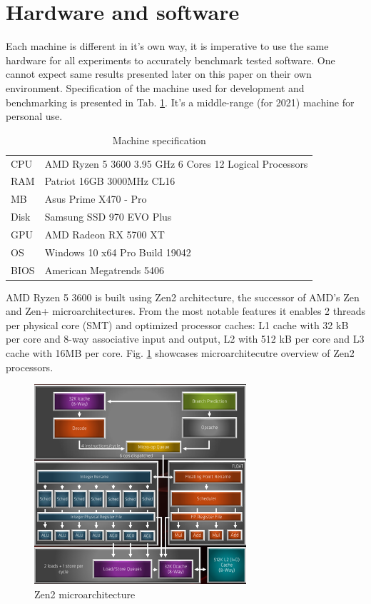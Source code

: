 \clearpage
\section{Hardware and software} 
Each machine is different in it's own way, it is imperative to use the same hardware for all experiments to accurately benchmark tested software. One cannot expect same results presented later on this paper on their own environment. Specification of the machine used for development and benchmarking is presented in Tab. \ref{tab: HardSpec}. It's a middle-range (for 2021) machine for personal use.

\begin{table}[!ht]
    \centering
    \caption{Machine specification}
		\label{tab: HardSpec}
    \begin{tabular}{p{1.5cm}p{6.5cm}}
			\toprule
			CPU  & AMD Ryzen 5 3600 3.95 GHz 6 Cores 12 Logical Processors \\
			RAM  & Patriot 16GB 3000MHz CL16 \\ 
			MB   & Asus Prime X470 - Pro \\ 
			Disk & Samsung SSD 970 EVO Plus \\
			GPU  & AMD Radeon RX 5700 XT \\ 
			OS   & Windows 10 x64 Pro Build 19042 \\ 
			BIOS & American Megatrends 5406 \\ 
			\bottomrule
    \end{tabular}
\end{table}

AMD Ryzen 5 3600 is built using Zen2 architecture,  the successor of AMD's Zen and Zen+ microarchitectures. From the most notable features it enables 2 threads per physical core (SMT) and optimized processor caches: L1 cache with 32 kB  per core and 8-way associative input and output, L2 with 512 kB per core and L3 cache with 16MB per core. Fig. \ref{fig:Zen} showcases microarchitecutre overview of Zen2 processors. \cite{Zen}

\begin{figure}[!ht]
	\centering
		\includegraphics[width = 0.7\textwidth]{figures03/Zen.PNG}
	\caption{Zen2 microarchitecture}
	\label{fig:Zen}
\end{figure}

